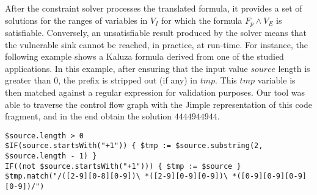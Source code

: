 After the constraint solver processes the translated formula, it provides a set of solutions for the ranges of variables in $V_I$ for which the formula $F_p \wedge V_E$ is satisfiable. Conversely, an unsatisfiable result produced by the solver means that the vulnerable sink cannot be reached, in practice, at run-time. For instance, the following example shows a Kaluza formula derived from one of the studied applications. In this example, after ensuring that the input value $source$ length is greater than 0, the prefix is stripped out (if any) in $tmp$. This $tmp$ variable is then matched against a regular expression for validation purposes. Our tool was able to traverse the control flow graph with the Jimple representation of this code fragment, and in the end obtain the solution $444494 4944$.
\lstset{numbers=left,xleftmargin=1cm, basicstyle=\ttfamily\scriptsize, breaklines=true}
\begin{lstlisting}
$source.length > 0
$IF(source.startsWith("+1")) { $tmp := $source.substring(2, $source.length - 1) }
IF((not $source.startsWith("+1"))) { $tmp := $source }
$tmp.match("/([2-9][0-8][0-9])\ *([2-9][0-9][0-9])\ *([0-9][0-9][0-9][0-9])/")
\end{lstlisting}

